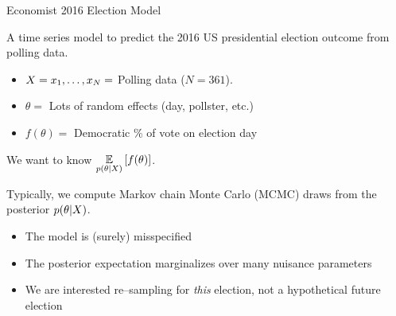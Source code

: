 \begin{frame}{Economist 2016 Election Model \citep{economist:2020:election}}

\begin{minipage}[t]{0.35\textwidth}
    \ElectionData{}
\end{minipage}
\begin{minipage}{0.04\textwidth}
\hfill
\end{minipage}
\begin{minipage}[t]{0.59\textwidth}

A time series model to predict the 2016 US presidential election
outcome from polling data.

\spskip
\begin{itemize}
\item $X = x_1, \ldots, x_N =$ Polling data ($N = 361$).
\item $\theta = $ Lots of random effects (day, pollster, etc.)
\item $f(\theta) = $ Democratic \% of vote on election day
\end{itemize}

\spskip
We want to know $\underset{p(\theta \vert X)}{\mathbb{E}}\left[f(\theta)\right]$.

\spskip
Typically, we compute Markov chain Monte Carlo (MCMC) draws from the
posterior $p(\theta \vert X)$.


\end{minipage}


\pause
{}

\pause
%
\begin{itemize}
\item The model is (surely) misspecified
\item The posterior expectation marginalizes over many nuisance parameters
\item We are interested re--sampling for \textit{this} election, not a hypothetical future election
\end{itemize}
%


\end{frame}

    





